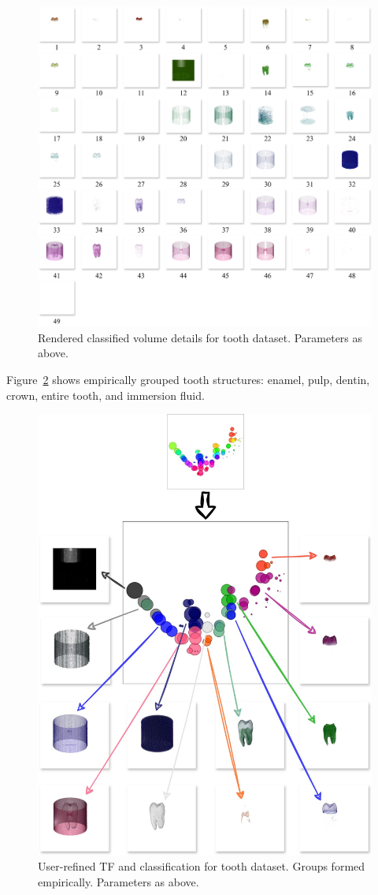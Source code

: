 \begin{figure}[htb!]
    \centering
    \includegraphics[width=\columnwidth]{figs/tooth-clusters.jpg} 
    \caption{Rendered classified volume details for tooth dataset. Parameters as above.}
    \label{fig:tooth-clusters}
\end{figure}

Figure~\ref{fig:tooth-groups} shows empirically grouped tooth structures: enamel, pulp, dentin, crown, entire tooth, and immersion fluid.

\begin{figure}[htb!]
    \centering
    \includegraphics[width=\columnwidth]{figs/tooth-groups.jpg}
    \caption{User-refined TF and classification for tooth dataset. Groups formed empirically. Parameters as above.}
    \label{fig:tooth-groups}
\end{figure}
